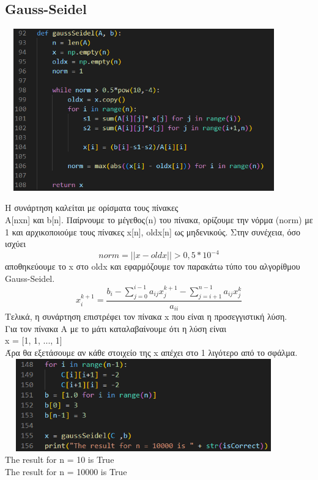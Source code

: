 \documentclass[a4paper,11pt]{article}
\newcommand{\lt}{\latintext}
\newcommand{\gt}{\greektext}
\begin{document}
	\subsection{\lt Gauss-Seidel}
	\includegraphics[height=7cm, width=12cm]{gauss-seidel.png}

	\normalsize{Η συνάρτηση καλείται με ορίσματα τους πίνακες \lt\\
A[nxn] \gt και \lt b[n]. \gt 
Παίρνουμε το μέγεθος\lt (n) \gt του πίνακα, ορίζουμε την νόρμα 
\lt (norm) \gt με 1 και
αρχικοποιούμε τους πίνακες \lt x[n], oldx[n] \gt ως μηδενικούς.
Στην συνέχεια, όσο ισχύει}
\begin{equation*}
norm = ||x - oldx|| > 0,5*10^{-4}
\end{equation*}
\normalsize{αποθηκεύουμε το \lt x \gt στο \lt oldx \gt και 
εφαρμόζουμε τον παρακάτω τύπο του αλγορίθμου \lt Gauss-Seidel.}
\begin{equation*}
x^{k+1}_i = \frac{b_i - \sum_{j=0}^{i-1} a_{ij} x_j^{k+1} -
\sum_{j=i+1}^{n-1} a_{ij} x^k_j}{a_{ii}}
\end{equation*}
\normalsize{Τελικά, η συνάρτηση επιστρέφει τον πίνακα 
\lt x \gt που είναι η προσεγγιστική λύση.
\\ Για τον πίνακα Α με το μάτι καταλαβαίνουμε ότι η λύση είναι
\\ \lt x = [1, 1, ..., 1]
\\ \gt Άρα θα εξετάσουμε αν κάθε στοιχείο της \lt x \gt
απέχει στο 1 λιγότερο από το σφάλμα.}
\\
\includegraphics[height=4cm, width=12cm]{result.png}
\\
\normalsize{\lt The result for n = 10 is True
\\The result for n = 10000 is True}
\end{document}
